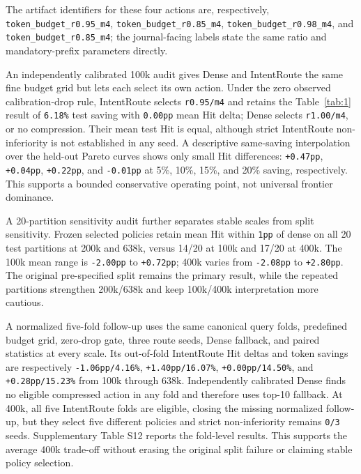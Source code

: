 The artifact identifiers for these four actions are, respectively, \nolinkurl{token_budget_r0.95_m4}, \nolinkurl{token_budget_r0.85_m4}, \nolinkurl{token_budget_r0.98_m4}, and \nolinkurl{token_budget_r0.85_m4}; the journal-facing labels state the same ratio and mandatory-prefix parameters directly.

An independently calibrated 100k audit gives Dense and IntentRoute the same fine budget grid but lets each select its own action. Under the zero observed calibration-drop rule, IntentRoute selects \nolinkurl{r0.95/m4} and retains the Table~\ref{tab:1} result of \nolinkurl{6.18%} test saving with \nolinkurl{0.00pp} mean Hit delta; Dense selects \nolinkurl{r1.00/m4}, or no compression. Their mean test Hit is equal, although strict IntentRoute non-inferiority is not established in any seed. A descriptive same-saving interpolation over the held-out Pareto curves shows only small Hit differences: \nolinkurl{+0.47pp}, \nolinkurl{+0.04pp}, \nolinkurl{+0.22pp}, and \nolinkurl{-0.01pp} at 5\%, 10\%, 15\%, and 20\% saving, respectively. This supports a bounded conservative operating point, not universal frontier dominance.

A 20-partition sensitivity audit further separates stable scales from split sensitivity. Frozen selected policies retain mean Hit within \nolinkurl{1pp} of dense on all 20 test partitions at 200k and 638k, versus 14/20 at 100k and 17/20 at 400k. The 100k mean range is \nolinkurl{-2.00pp} to \nolinkurl{+0.72pp}; 400k varies from \nolinkurl{-2.08pp} to \nolinkurl{+2.80pp}. The original pre-specified split remains the primary result, while the repeated partitions strengthen 200k/638k and keep 100k/400k interpretation more cautious.

A normalized five-fold follow-up uses the same canonical query folds, predefined budget grid, zero-drop gate, three route seeds, Dense fallback, and paired statistics at every scale. Its out-of-fold IntentRoute Hit deltas and token savings are respectively \nolinkurl{-1.06pp/4.16%}, \nolinkurl{+1.40pp/16.07%}, \nolinkurl{+0.00pp/14.50%}, and \nolinkurl{+0.28pp/15.23%} from 100k through 638k. Independently calibrated Dense finds no eligible compressed action in any fold and therefore uses top-10 fallback. At 400k, all five IntentRoute folds are eligible, closing the missing normalized follow-up, but they select five different policies and strict non-inferiority remains \nolinkurl{0/3} seeds. Supplementary Table S12 reports the fold-level results. This supports the average 400k trade-off without erasing the original split failure or claiming stable policy selection.

